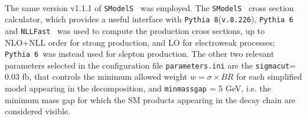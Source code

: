 \documentclass[a4paper,11pt]{article}
\newcommand{\SMO}{\texttt{SModelS\xspace}}
\begin{document}
\\
The same version v1.1.1 of \SMO~ was employed. The \SMO~ cross section calculator, which provides a useful interface with \texttt{Pythia 8}(\texttt{v.8.226})\cite{Sjostrand:2014zea}, \texttt{Pythia 6}\cite{Sjostrand:2006za} and \texttt{NLLFast}~\cite{nllfast,Beenakker:1996ch,Kulesza:2008jb,Kulesza:2009kq,Beenakker:2009ha,Beenakker:2011fu,Beenakker:1997ut,Beenakker:2010nq} was used to compute the production cross sections, up to NLO+NLL order for strong production, and LO for electroweak processes; \texttt{Pythia 6}~was instead used for slepton production. The other two relevant parameters selected in the configuration file \texttt{parameters.ini} are the \texttt{sigmacut}= 0.03 fb, that controls the  minimum allowed weight  $w = \sigma \times BR$ for each simplified model appearing in the decomposition, and \verb|minmassgap| = 5 GeV, i.e. the minimum mass gap for which the SM products appearing in the decay chain are considered visible. 
%
\end{document}

